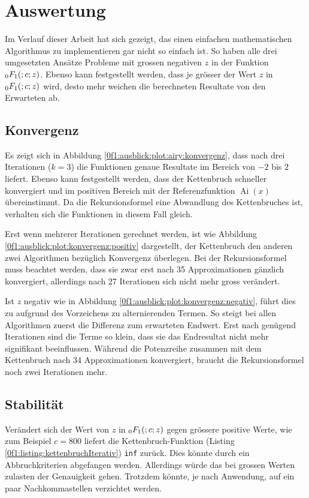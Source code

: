 %
%
%
\section{Auswertung
\label{0f1:section:teil3}}
Im Verlauf dieser Arbeit hat sich gezeigt, 
das einen einfachen mathematischen Algorithmus zu implementieren gar nicht so einfach ist.
So haben alle drei umgesetzten Ansätze Probleme mit grossen negativen $z$ in der Funktion $\mathstrut_0F_1(;c;z)$.
Ebenso kann festgestellt werden, dass je grösser der Wert $z$ in $\mathstrut_0F_1(;c;z)$ wird, desto mehr weichen die berechneten Resultate von den Erwarteten \cite{0f1:wolfram-0f1} ab.

\subsection{Konvergenz
\label{0f1:subsection:konvergenz}}
Es zeigt sich in Abbildung \ref{0f1:ausblick:plot:airy:konvergenz}, dass nach drei Iterationen ($k = 3$) die Funktionen genaue Resultate im Bereich von $-2$ bis $2$ liefert. Ebenso kann festgestellt werden, dass der Kettenbruch schneller konvergiert und im positiven Bereich mit der Referenzfunktion $\operatorname{Ai}(x)$ übereinstimmt. Da die Rekursionsformel eine Abwandlung des Kettenbruches ist, verhalten sich die Funktionen in diesem Fall gleich.

Erst wenn mehrerer Iterationen gerechnet werden, ist wie Abbildung \ref{0f1:ausblick:plot:konvergenz:positiv} dargestellt, der Kettenbruch den anderen zwei Algorithmen bezüglich Konvergenz überlegen. Bei der Rekursionsformel muss beachtet werden, dass sie zwar erst nach 35 Approximationen gänzlich konvergiert, allerdings nach 27 Iterationen sich nicht mehr gross verändert.

Ist $z$ negativ wie in Abbildung \ref{0f1:ausblick:plot:konvergenz:negativ}, führt dies zu aufgrund des Vorzeichens zu alternierenden Termen. So steigt bei allen Algorithmen zuerst die Differenz zum erwarteten Endwert. Erst nach genügend Iterationen sind die Terme so klein, dass sie das Endresultat nicht mehr signifikant beeinflussen. Während die Potenzreihe zusammen mit dem Kettenbruch nach 34 Approximationen konvergiert, braucht die Rekursionsformel noch zwei Iterationen mehr.  


\subsection{Stabilität
\label{0f1:subsection:Stabilitaet}}
Verändert sich der Wert von $z$ in $\mathstrut_0F_1(;c;z)$ gegen grössere positive Werte, wie zum Beispiel $c = 800$ liefert die Kettenbruch-Funktion (Listing \ref{0f1:listing:kettenbruchIterativ}) \verb+inf+ zurück. Dies könnte durch ein Abbruchkriterien abgefangen werden. Allerdings würde das bei grossen Werten zulasten der Genauigkeit gehen. Trotzdem könnte, je nach Anwendung, auf ein paar Nachkommastellen verzichtet werden.

